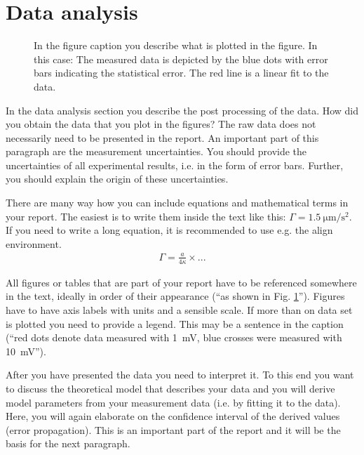 \section{Data analysis}

\begin{figure}
\centering
\caption{In the figure caption you describe what is plotted in the
figure. In this case: The measured data is depicted by the blue dots
with error bars indicating the statistical error. The red line is a
linear fit to the data.} \label{fig1}
\end{figure}

In the data analysis section you describe the post processing of the
data. How did you obtain the data that you plot in the figures? The raw data does not necessarily need
to be presented in the report. An important part of this paragraph
are the measurement uncertainties. You should provide the
uncertainties of all experimental results, i.e. in the form of error
bars. Further, you should explain the origin of these uncertainties.

There are many way how you can include equations and mathematical terms in your report. The easiest is to write them inside the text like this: $\Gamma =\SI{1.5}{\micro\meter\per\square\second}$. If you need to write a long equation, it is recommended to use e.g. the align environment.
\begin{align}
    \Gamma = \frac{a}{4\kappa}\times ...
\end{align}

All figures or tables that are part of your report have to be
referenced somewhere in the text, ideally in order of their
appearance (``as shown in Fig. \ref{fig1}''). Figures have to
have axis labels with units and a sensible scale. If more than on
data set is plotted you need to provide a legend. This may be a sentence in the caption (``red dots denote data measured with \SI{1}{\milli\volt}, blue crosses were measured with \SI{10}{\milli\volt}'').

After you have presented the data you need to interpret it. To this
end you want to discuss the theoretical model that describes your
data and you will derive model parameters from your measurement data
(i.e. by fitting it to the data). Here, you will again elaborate on
the confidence interval of the derived values (error propagation).
This is an important part of the report and it will be the basis for
the next paragraph.